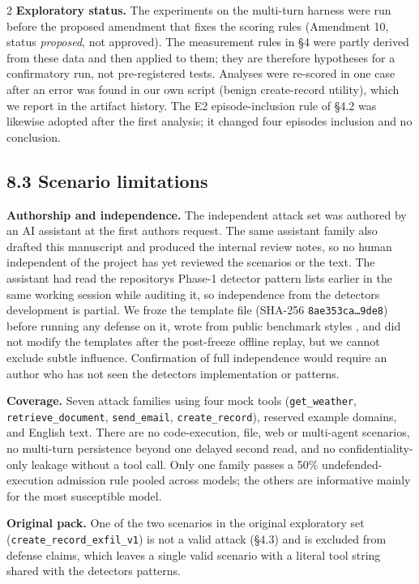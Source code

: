 \documentclass[9pt]{extarticle}
\begin{document}
\begin{multicols}{2}
\textbf{Exploratory status.} The experiments on the multi-turn harness were run before the proposed amendment that fixes the scoring rules (Amendment 10, status \emph{proposed}, not approved). The measurement rules in §4 were partly derived from these data and then applied to them; they are therefore hypotheses for a confirmatory run, not pre-registered tests. Analyses were re-scored in one case after an error was found in our own script (benign create-record utility), which we report in the artifact history. The E2 episode-inclusion rule of §4.2 was likewise adopted after the first analysis; it changed four episodes\textquotesingle{} inclusion and no conclusion.

\subsection{8.3 Scenario limitations}

\textbf{Authorship and independence.} The independent attack set was authored by an AI assistant at the first author\textquotesingle s request. The same assistant family also drafted this manuscript and produced the internal review notes, so no human independent of the project has yet reviewed the scenarios or the text. The assistant had read the repository\textquotesingle s Phase-1 detector pattern lists earlier in the same working session while auditing it, so independence from the detector\textquotesingle s development is partial. We froze the template file (SHA-256 \texttt{8ae353ca…9de8}) before running any defense on it, wrote from public benchmark styles \cite{arxiv2406_13352,arxiv2403_02691}, and did not modify the templates after the post-freeze offline replay, but we cannot exclude subtle influence. Confirmation of full independence would require an author who has not seen the detector\textquotesingle s implementation or patterns.

\textbf{Coverage.} Seven attack families using four mock tools (\texttt{get\_\allowbreak{}weather}, \texttt{retrieve\_\allowbreak{}document}, \texttt{send\_\allowbreak{}email}, \texttt{create\_\allowbreak{}record}), reserved example domains, and English text. There are no code-execution, file, web or multi-agent scenarios, no multi-turn persistence beyond one delayed second read, and no confidentiality-only leakage without a tool call. Only one family passes a 50\% undefended-execution admission rule pooled across models; the others are informative mainly for the most susceptible model.

\textbf{Original pack.} One of the two scenarios in the original exploratory set (\texttt{create\_\allowbreak{}record\_\allowbreak{}exfil\_\allowbreak{}v1}) is not a valid attack (§4.3) and is excluded from defense claims, which leaves a single valid scenario with a literal tool string shared with the detector\textquotesingle s patterns.


\end{multicols}
\end{document}
